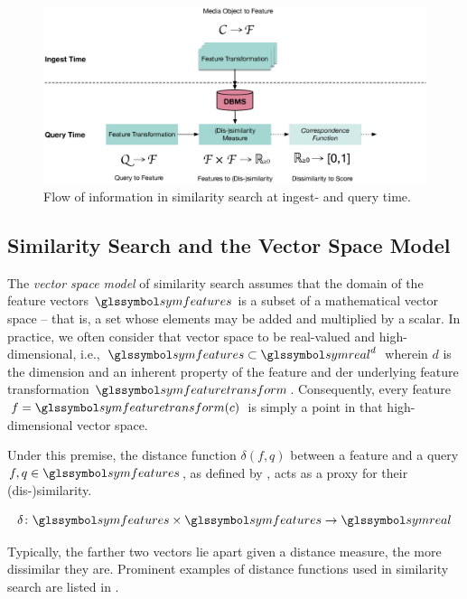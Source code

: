 \begin{figure}[ht]
    \centering
    \includegraphics[width=\textwidth]{figures/multimedia-retrieval-pipeline}
    \caption{Flow of information in similarity search at ingest- and query time.}
    \label{figure:multimedia_retrieval_flow}
\end{figure}

\subsection{Similarity Search and the Vector Space Model}

The \emph{vector space model} of similarity search assumes that the domain of the feature vectors $\symfeatures$ is a subset of a mathematical vector space -- that is, a set whose elements may be added and multiplied by a scalar. In practice, we often consider that vector space to be real-valued and high-dimensional, i.e., $\symfeatures \subset \symreal^{d}$ wherein $d$ is the dimension and an inherent property of the feature and der underlying feature transformation $\symfeaturetransform$. Consequently, every feature $f = \symfeaturetransform (c)$ is simply a point in that high-dimensional vector space.

Under this premise, the distance function $\delta(f,q)$ between a feature and a query $f,q \in \symfeatures$, as defined by , acts as a proxy for their (dis-)similarity.

\begin{equation}
    \label{eq:distance_function}
    \delta \colon \symfeatures \times \symfeatures \rightarrow \symreal
\end{equation}

 Typically, the farther two vectors lie apart given a distance measure, the more dissimilar they are. Prominent examples of distance functions used in similarity search are listed in . 

